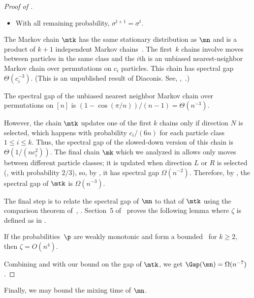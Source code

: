 \documentclass{toc}
\begin{document}
\begin{proof}[Proof of ]
\begin{itemize}
\item With all remaining probability, $\sigma^{t+1} = \sigma^t.$
\end{itemize}

The Markov chain $\mtk$ has the same
stationary distribution as $\mn$ and is a product of
$k+1$ independent Markov chains~\cite{MS}.  The first~$k$ chains involve moves
between particles in the same class and the $i$th is an unbiased
nearest-neighbor Markov chain over permutations on $c_i$ particles.
%
%
%
This chain has spectral gap $\Theta(c_i^{-3})$. (This is an 
unpublished result of Diaconis. See, \eg,~\cite{wilson}.)    %
\begin{lemma}[Diaconis]
The spectral gap of the unbiased nearest neighbor Markov chain
over permutations on $[n]$ is $(1-\cos(\pi/n))/(n-1)=\Theta(n^{-3})$.
\end{lemma}
\noindent However, the chain $\mtk$ updates one of the first $k$ chains
only if direction $N$ is selected,  which happens with probability $c_i/(6n)$
for each particle class $1\leq i \leq k.$  Thus, the spectral gap of
the slowed-down version of this chain is $\Theta(1/(nc_i^2))$.
The final chain $\mk$ which we analyzed in 
allows only moves between different particle classes; it is updated when
direction $L$ or $R$ is selected (\ie,  with probability $2/3$),
so,  %
by
, it has spectral gap  $\Omega(n^{-2})$.
Therefore, by , the spectral gap of $\mtk$
is $\Omega(n^{-3})$.

The final step is to relate the spectral gap of $\mn$ to that of $\mtk$
using the comparison theorem of~\cite{dsc}, .  
Section~5 of~\cite{MS} proves the following lemma where $\zeta$ is 
defined as in .

\begin{lemma}[\cite{MS}]\label{lem_comp} If the probabilities~$\p$ are
  weakly monotonic and form a bounded \kP\, for $k\geq 2$, then $\zeta=O(n^4)$.
\end{lemma}

\noindent Combining  and 
with our bound on the gap of $\mtk$, we get $\Gap(\mn)=\Omega(n^{-7})$. 
%
\end{proof}

\vspace{.2in}

Finally, we may bound the mixing time of $\mn$. 
\end{document}
